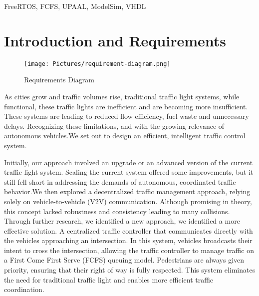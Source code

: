 \documentclass[conference]{IEEEtran}
\begin{document}
\begin{IEEEkeywords}
FreeRTOS, FCFS, UPAAL, ModelSim, VHDL
\end{IEEEkeywords}

\section{Introduction and Requirements}
\begin{figure*}[!t]
    \centering
    \texttt{[image: Pictures/requirement-diagram.png]}
    \caption{Requirements Diagram}
    \label{fig:requirements diagram}
\end{figure*}

As cities grow and traffic volumes rise, traditional traffic light systems, while functional, these traffic lights are inefficient and are becoming more insufficient. These systems are leading to reduced flow efficiency, fuel waste and unnecessary delays. Recognizing these limitations, and with the growing relevance of autonomous vehicles.We set out to design an efficient, intelligent traffic control system.

Initially, our approach involved an upgrade or an advanced version of the current traffic light system. Scaling the current system offered some improvements, but it still fell short in addressing the demands of autonomous, coordinated traffic behavior.We then explored a decentralized traffic management approach, relying solely on vehicle-to-vehicle (V2V) communication. Although promising in theory, this concept lacked robustness and consistency leading to many collisions.
Through further research, we identified a new approach, we identified a more effective solution. A centralized traffic controller that communicates directly with the vehicles approaching an intersection. In this system, vehicles broadcasts their intent to cross the intersection, allowing the traffic controller to manage traffic on a First Come First Serve (FCFS) queuing model. Pedestrians are always given priority, ensuring that their right of way is fully respected. This system eliminates the need for traditional traffic light and enables more efficient traffic coordination. 
\end{document}
